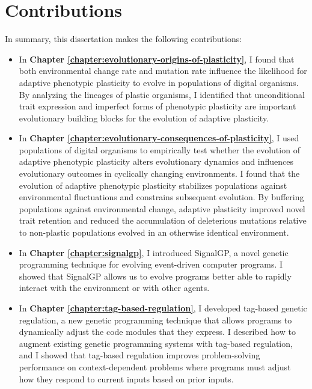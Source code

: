 \section{Contributions}

In summary, this dissertation makes the following contributions:


\begin{itemize}
    \item In \textbf{Chapter \ref{chapter:evolutionary-origins-of-plasticity}}, I found that both environmental change rate and mutation rate influence the likelihood for adaptive phenotypic plasticity to evolve in populations of digital organisms. 
    By analyzing the lineages of plastic organisms, I identified that unconditional trait expression and imperfect forms of phenotypic plasticity are important evolutionary building blocks for the evolution of adaptive plasticity. 
    
    \item In \textbf{Chapter \ref{chapter:evolutionary-consequences-of-plasticity}}, I used populations of digital organisms to empirically test whether the evolution of adaptive phenotypic plasticity alters evolutionary dynamics and influences evolutionary outcomes in cyclically changing environments.
    I found that the evolution of adaptive phenotypic plasticity stabilizes populations against environmental fluctuations and constrains subsequent evolution.
    By buffering populations against environmental change, adaptive plasticity improved novel trait retention and reduced the accumulation of deleterious mutations relative to non-plastic populations evolved in an otherwise identical environment. 
    
    \item In \textbf{Chapter \ref{chapter:signalgp}}, I introduced SignalGP, a novel genetic programming technique for evolving event-driven computer programs. 
    I showed that SignalGP allows us to evolve programs better able to rapidly interact with the environment or with other agents. 
    
    \item In \textbf{Chapter \ref{chapter:tag-based-regulation}}, I developed tag-based genetic regulation, a new genetic programming technique that allows programs to dynamically adjust the code modules that they express.
    I described how to augment existing genetic programming systems with tag-based regulation, and I showed that tag-based regulation improves problem-solving performance on context-dependent problems where programs must adjust how they respond to current inputs based on prior inputs.
    

\end{itemize}
